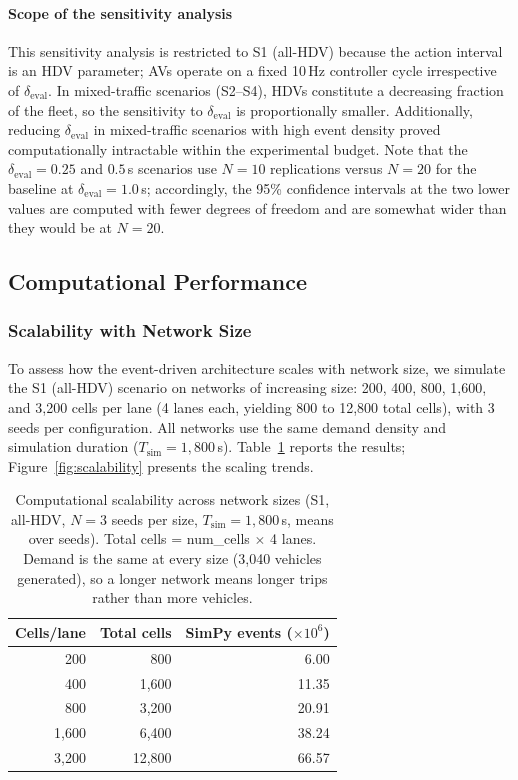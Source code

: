 \documentclass[review,number]{elsarticle}
\begin{document}
\paragraph{Scope of the sensitivity analysis} This sensitivity analysis is restricted to S1 (all-HDV) because the action interval is an HDV parameter; AVs operate on a fixed 10\,Hz controller cycle irrespective of $\delta_{\text{eval}}$. In mixed-traffic scenarios (S2--S4), HDVs constitute a decreasing fraction of the fleet, so the sensitivity to $\delta_{\text{eval}}$ is proportionally smaller. Additionally, reducing $\delta_{\text{eval}}$ in mixed-traffic scenarios with high event density proved computationally intractable within the experimental budget. Note that the $\delta_{\text{eval}} = 0.25$ and $0.5$\,s scenarios use $N = 10$ replications versus $N = 20$ for the baseline at $\delta_{\text{eval}} = 1.0$\,s; accordingly, the 95\% confidence intervals at the two lower values are computed with fewer degrees of freedom and are somewhat wider than they would be at $N = 20$.


\subsection{Computational Performance}
\label{sec:exp_performance_new}

\subsubsection{Scalability with Network Size}
\label{sec:exp_scalability}

To assess how the event-driven architecture scales with network size, we simulate the S1 (all-HDV) scenario on networks of increasing size: 200, 400, 800, 1{,}600, and 3{,}200 cells per lane (4 lanes each, yielding 800 to 12{,}800 total cells), with 3 seeds per configuration. All networks use the same demand density and simulation duration ($T_{\text{sim}} = 1{,}800$\,s). Table~\ref{tab:scalability} reports the results; Figure~\ref{fig:scalability} presents the scaling trends.

\begin{table}[ht]
\centering
\caption{Computational scalability across network sizes (S1, all-HDV, $N = 3$ seeds per size, $T_{\text{sim}} = 1{,}800$\,s, means over seeds). Total cells = num\_cells $\times$ 4 lanes. Demand is the same at every size (3{,}040 vehicles generated), so a longer network means longer trips rather than more vehicles.}
\label{tab:scalability}
\begin{tabular}{@{}rrr@{}}
\toprule
Cells/lane & Total cells & SimPy events ($\times 10^6$) \\
\midrule
200 & 800 & 6.00 \\
400 & 1{,}600 & 11.35 \\
800 & 3{,}200 & 20.91 \\
1{,}600 & 6{,}400 & 38.24 \\
3{,}200 & 12{,}800 & 66.57 \\
\bottomrule
\end{tabular}
\end{table}
\end{document}

